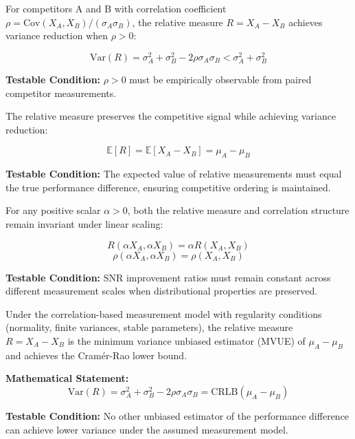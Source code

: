 \begin{axiom}
For competitors A and B with correlation coefficient $\rho = \text{Cov}(X_A, X_B)/(\sigma_A \sigma_B)$, the relative measure $R = X_A - X_B$ achieves variance reduction when $\rho > 0$:

$$\text{Var}(R) = \sigma_A^2 + \sigma_B^2 - 2\rho\sigma_A\sigma_B < \sigma_A^2 + \sigma_B^2$$

\textbf{Testable Condition:} $\rho > 0$ must be empirically observable from paired competitor measurements.
\end{axiom}

\begin{axiom}
The relative measure preserves the competitive signal while achieving variance reduction:

$$\mathbb{E}[R] = \mathbb{E}[X_A - X_B] = \mu_A - \mu_B$$

\textbf{Testable Condition:} The expected value of relative measurements must equal the true performance difference, ensuring competitive ordering is maintained.
\end{axiom}

\begin{axiom}
For any positive scalar $\alpha > 0$, both the relative measure and correlation structure remain invariant under linear scaling:

$$R(\alpha X_A, \alpha X_B) = \alpha R(X_A, X_B)$$
$$\rho(\alpha X_A, \alpha X_B) = \rho(X_A, X_B)$$

\textbf{Testable Condition:} SNR improvement ratios must remain constant across different measurement scales when distributional properties are preserved.
\end{axiom}

\begin{axiom}
Under the correlation-based measurement model with regularity conditions (normality, finite variances, stable parameters), the relative measure $R = X_A - X_B$ is the minimum variance unbiased estimator (MVUE) of $\mu_A - \mu_B$ and achieves the Cramér-Rao lower bound.

\textbf{Mathematical Statement:}
$$\text{Var}(R) = \sigma_A^2 + \sigma_B^2 - 2\rho\sigma_A\sigma_B = \text{CRLB}(\mu_A - \mu_B)$$

\textbf{Testable Condition:} No other unbiased estimator of the performance difference can achieve lower variance under the assumed measurement model.
\end{axiom}

